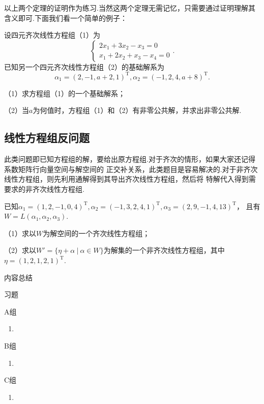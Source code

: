 以上两个定理的证明作为练习.当然这两个定理无需记忆，只需要通过证明理解其含义即可.下面我们看一个简单的例子：
\begin{example}
	设四元齐次线性方程组\textup{（1）}为$$\begin{cases}
		2x_1+3x_2-x_3=0 \\ x_1+2x_2+x_3-x_4=0
	\end{cases}.$$已知另一个四元齐次线性方程组\textup{（2）}的基础解系为
	$$\alpha_1=(2,-1,a+2,1)^\mathrm{T},\alpha_2=(-1,2,4,a+8)^\mathrm{T}.$$

	\textup{（1）}求方程组\textup{（1）}的一个基础解系；

	\textup{（2）}当$a$为何值时，方程组\textup{（1）}和\textup{（2）}有非零公共解，并求出非零公共解.
\end{example}
\subsection{线性方程组反问题}
此类问题即已知方程组的解，要给出原方程组.对于齐次的情形，如果大家还记得系数矩阵行向量空间与解空间的
正交补关系，此类题目是容易解决的.对于非齐次线性方程组，则先利用通解得到其导出齐次线性方程组，然后将
特解代入得到需要求的非齐次线性方程组.
\begin{example}
	已知$\alpha_1=(1,2,-1,0,4)^\mathrm{T},\alpha_2=(-1,3,2,4,1)^\mathrm{T},\alpha_3=(2,9,-1,4,13)^\mathrm{T}$，
	且有$W=L(\alpha_1,\alpha_2,\alpha_3)$.

	\textup{（1）}求以$W$为解空间的一个齐次线性方程组；

	\textup{（2）}求以$W'=\{\eta+\alpha\ |\ \alpha\in W\}$为解集的一个非齐次线性方程组，其中$\eta=(1,2,1,2,1)^\mathrm{T}$.
\end{example}

\vspace{2ex} 
\centerline{\heiti \Large 内容总结}

\vspace{2ex} 

\centerline{\heiti \Large 习题}
\vspace{2ex} 
{\kaishu }
\begin{flushright}
    \kaishu

\end{flushright}
\centerline{\heiti A组}
\begin{enumerate}
	\item 
\end{enumerate}
\centerline{\heiti B组}
\begin{enumerate}
	\item 
\end{enumerate}
\centerline{\heiti C组}
\begin{enumerate}
	\item 
\end{enumerate}